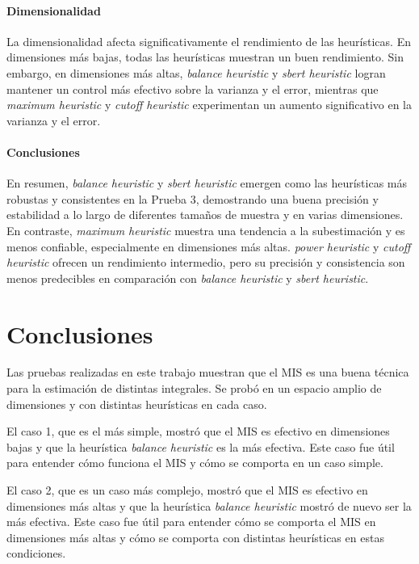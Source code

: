 \documentclass{article}
\begin{document}
\paragraph{Dimensionalidad}
La dimensionalidad afecta significativamente el rendimiento de las heurísticas. En dimensiones más bajas, todas las heurísticas muestran un buen rendimiento. Sin embargo, en dimensiones más altas, \textit{balance heuristic} y \textit{sbert heuristic} logran mantener un control más efectivo sobre la varianza y el error, mientras que \textit{maximum heuristic} y \textit{cutoff heuristic} experimentan un aumento significativo en la varianza y el error.

\paragraph{Conclusiones}
En resumen, \textit{balance heuristic} y \textit{sbert heuristic} emergen como las heurísticas más robustas y consistentes en la Prueba 3, demostrando una buena precisión y estabilidad a lo largo de diferentes tamaños de muestra y en varias dimensiones. En contraste, \textit{maximum heuristic} muestra una tendencia a la subestimación y es menos confiable, especialmente en dimensiones más altas. \textit{power heuristic} y \textit{cutoff heuristic} ofrecen un rendimiento intermedio, pero su precisión y consistencia son menos predecibles en comparación con \textit{balance heuristic} y \textit{sbert heuristic}.

\section{Conclusiones}

Las pruebas realizadas en este trabajo muestran que el MIS es una buena técnica para la estimación de distintas integrales.
Se probó en un espacio amplio de dimensiones y con distintas heurísticas en cada caso.

El caso 1, que es el más simple, mostró que el MIS es efectivo en dimensiones bajas y que la heurística \textit{balance heuristic} es la más efectiva.
Este caso fue útil para entender cómo funciona el MIS y cómo se comporta en un caso simple.

El caso 2, que es un caso más complejo, mostró que el MIS es efectivo en dimensiones más altas y que la heurística \textit{balance heuristic} mostró de nuevo ser la más efectiva.
Este caso fue útil para entender cómo se comporta el MIS en dimensiones más altas y cómo se comporta con distintas heurísticas en estas condiciones.
\end{document}

